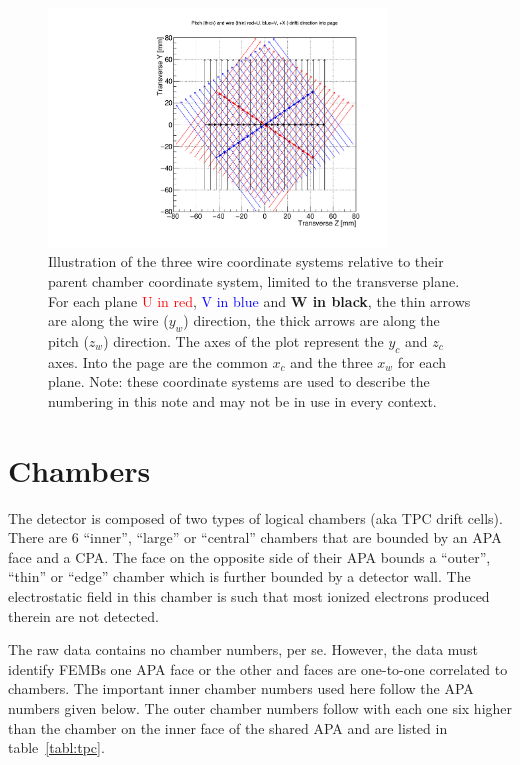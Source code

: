 \documentclass[pdftex,12pt,letter]{article}
\begin{document}
\begin{figure}[htp]
  \centering
  \includegraphics[width=0.8\textwidth]{test_pimpos_draw.pdf}
  \caption{Illustration of the three wire coordinate systems relative to their parent chamber coordinate system, limited to the transverse plane.  For each plane \textcolor{red}{U in red}, \textcolor{blue}{V in blue} and \textbf{W in black}, the thin arrows are along the wire ($y_w$) direction, the thick arrows are along the pitch ($z_w$) direction. The axes of the plot represent the $y_c$ and $z_c$ axes.  Into the page are the common $x_c$ and the three $x_w$ for each plane.  Note: these coordinate systems are used to describe the numbering in this note and may not be in use in every context.}
  \label{fig:coords}
\end{figure}


\section{Chambers}

The detector is composed of two types of logical chambers (aka TPC
drift cells).  There are 6 ``inner'', ``large'' or ``central''
chambers that are bounded by an APA face and a CPA.  The face on the
opposite side of their APA bounds a ``outer'', ``thin'' or ``edge''
chamber which is further bounded by a detector wall.  The
electrostatic field in this chamber is such that most ionized
electrons produced therein are not detected.

The raw data contains no chamber numbers, per se.  However, the data
must identify FEMBs one APA face or the other and faces are one-to-one
correlated to chambers.  The important inner chamber numbers used here
follow the APA numbers given below.  The outer chamber numbers follow
with each one six higher than the chamber on the inner face of the
shared APA and are listed in table~\ref{tabl:tpc}.
\end{document}
